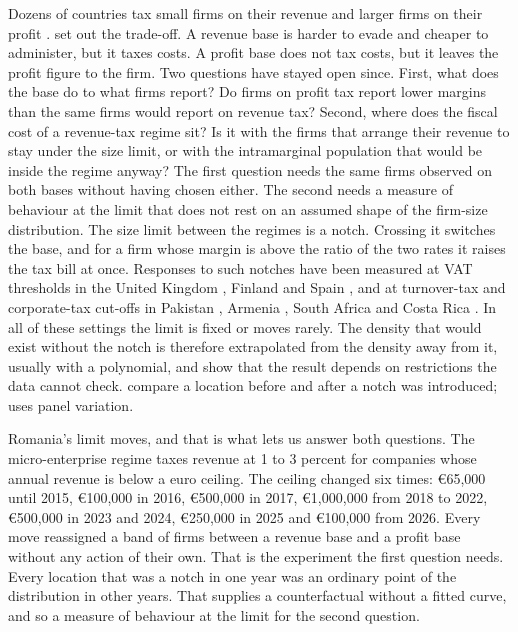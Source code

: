 \documentclass[12pt]{article}
\begin{document}
Dozens of countries tax small firms on their revenue and larger firms on their profit \citep{sharma2025dual, kanbur2014, dharmapala2011}. \citet{best2015} set out the trade-off. A revenue base is harder to evade and cheaper to administer, but it taxes costs. A profit base does not tax costs, but it leaves the profit figure to the firm. Two questions have stayed open since. First, what does the base do to what firms report? Do firms on profit tax report lower margins than the same firms would report on revenue tax? Second, where does the fiscal cost of a revenue-tax regime sit? Is it with the firms that arrange their revenue to stay under the size limit, or with the intramarginal population that would be inside the regime anyway? The first question needs the same firms observed on both bases without having chosen either. The second needs a measure of behaviour at the limit that does not rest on an assumed shape of the firm-size distribution. The size limit between the regimes is a notch. Crossing it switches the base, and for a firm whose margin is above the ratio of the two rates it raises the tax bill at once. Responses to such notches have been measured at VAT thresholds in the United Kingdom \citep{liu2021vat}, Finland \citep{harju2019vat} and Spain \citep{almunia2018}, and at turnover-tax and corporate-tax cut-offs in Pakistan \citep{kleven2013}, Armenia \citep{asatryan2016}, South Africa \citep{boonzaaier2019} and Costa Rica \citep{bachas2021}. In all of these settings the limit is fixed or moves rarely. The density that would exist without the notch is therefore extrapolated from the density away from it, usually with a polynomial, and \citet{blomquist2021} show that the result depends on restrictions the data cannot check. \citet{best2018} compare a location before and after a notch was introduced; \citet{marx2024} uses panel variation.

Romania's limit moves, and that is what lets us answer both questions. The micro-enterprise regime taxes revenue at 1 to 3 percent for companies whose annual revenue is below a euro ceiling. The ceiling changed six times: \euro{}65,000 until 2015, \euro{}100,000 in 2016, \euro{}500,000 in 2017, \euro{}1,000,000 from 2018 to 2022, \euro{}500,000 in 2023 and 2024, \euro{}250,000 in 2025 and \euro{}100,000 from 2026. Every move reassigned a band of firms between a revenue base and a profit base without any action of their own. That is the experiment the first question needs. Every location that was a notch in one year was an ordinary point of the distribution in other years. That supplies a counterfactual without a fitted curve, and so a measure of behaviour at the limit for the second question.
\end{document}
